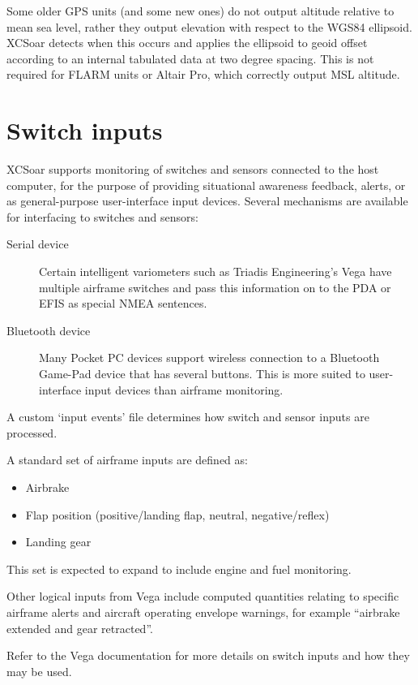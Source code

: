 Some older GPS units (and some new ones) do not output altitude
relative to mean sea level, rather they output elevation with respect
to the WGS84 ellipsoid.  XCSoar detects when this occurs and applies
the ellipsoid to geoid offset according to an internal tabulated data
at two degree spacing.  This is not required for FLARM units or Altair
Pro, which correctly output MSL altitude.

\section{Switch inputs}

XCSoar supports monitoring of switches and sensors connected to the
host computer, for the purpose of providing situational awareness
feedback, alerts, or as general-purpose user-interface input devices.
Several mechanisms are available for interfacing to switches and
sensors:
\begin{description}
\item[Serial device]  Certain intelligent variometers such as
 Triadis Engineering's Vega have multiple airframe switches
 and pass this information on to the PDA or EFIS as special
 NMEA sentences.
\item[Bluetooth device]  Many Pocket PC devices support wireless
 connection to a Bluetooth Game-Pad device that has several buttons.
 This is more suited to user-interface input devices than airframe
 monitoring.
\end{description}

A custom `input events' file determines how switch and sensor
inputs are processed.

A standard set of airframe inputs are defined as:
\begin{itemize}
\item Airbrake
\item Flap position (positive/landing flap, neutral, negative/reflex)
\item Landing gear
\end{itemize}

This set is expected to expand to include engine and fuel monitoring.

Other logical inputs from Vega include computed quantities relating to
specific airframe alerts and aircraft operating envelope warnings, for
example ``airbrake extended and gear retracted''.  

Refer to the Vega documentation %
for more details on switch inputs and how they may be used.

